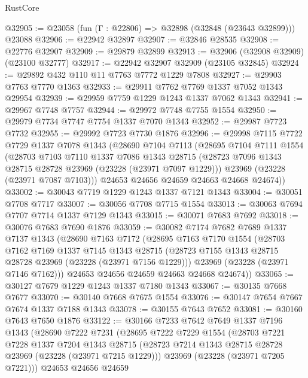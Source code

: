 \begin{lexlean}{RustCore}
\begin{coremodule}
@32905 := @23058 (fun (Γ : @22806) => @32898 (@32848 (@23643 @32899))) @23088
@32906 := @22942 @32897
@32907 := @32846 @28535
@32908 := @22776 @32907
@32909 := @29879 @32899
@32913 := @32906 (@32908 @32909) (@23100 @32777)
@32917 := @22942 @32907 @32909 (@23105 @32845)
@32924 := @29892 @432 @110 @11 @7763 @7772 @1229 @7808
@32927 := @29903 @7763 @7770 @1363
@32933 := @29911 @7762 @7769 @1337 @7052 @1343 @29954
@32939 := @29959 @7759 @1229 @1243 @1337 @7062 @1343
@32941 := @29967 @7748 @7757
@32944 := @29972 @7748 @7755 @1554
@32950 := @29979 @7734 @7747 @7754 @1337 @7070 @1343
@32952 := @29987 @7723 @7732
@32955 := @29992 @7723 @7730 @1876
@32996 := @29998
    @7115
    @7722
    @7729
    @1337
    @7078
    @1343
    (@28690
      @7104
      @7113
      (@28695
        @7104
        @7111
        @1554
        (@28703
          @7103
          @7110
          @1337
          @7086
          @1343
          @28715
          (@28723 @7096 @1343 @28715 @28728 @23969 (@23228 (@23971 @7097 @1229)))
          @23969
          (@23228 (@23971 @7087 @7103)))
        @24653
        @24656
        @24659
        @24663
        @24668
        @24674))
@33002 := @30043 @7719 @1229 @1243 @1337 @7121 @1343
@33004 := @30051 @7708 @7717
@33007 := @30056 @7708 @7715 @1554
@33013 := @30063 @7694 @7707 @7714 @1337 @7129 @1343
@33015 := @30071 @7683 @7692
@33018 := @30076 @7683 @7690 @1876
@33059 := @30082
    @7174
    @7682
    @7689
    @1337
    @7137
    @1343
    (@28690
      @7163
      @7172
      (@28695
        @7163
        @7170
        @1554
        (@28703
          @7162
          @7169
          @1337
          @7145
          @1343
          @28715
          (@28723 @7155 @1343 @28715 @28728 @23969 (@23228 (@23971 @7156 @1229)))
          @23969
          (@23228 (@23971 @7146 @7162)))
        @24653
        @24656
        @24659
        @24663
        @24668
        @24674))
@33065 := @30127 @7679 @1229 @1243 @1337 @7180 @1343
@33067 := @30135 @7668 @7677
@33070 := @30140 @7668 @7675 @1554
@33076 := @30147 @7654 @7667 @7674 @1337 @7188 @1343
@33078 := @30155 @7643 @7652
@33081 := @30160 @7643 @7650 @1876
@33122 := @30166
    @7233
    @7642
    @7649
    @1337
    @7196
    @1343
    (@28690
      @7222
      @7231
      (@28695
        @7222
        @7229
        @1554
        (@28703
          @7221
          @7228
          @1337
          @7204
          @1343
          @28715
          (@28723 @7214 @1343 @28715 @28728 @23969 (@23228 (@23971 @7215 @1229)))
          @23969
          (@23228 (@23971 @7205 @7221)))
        @24653
        @24656
        @24659

\end{coremodule}
\end{lexlean}
